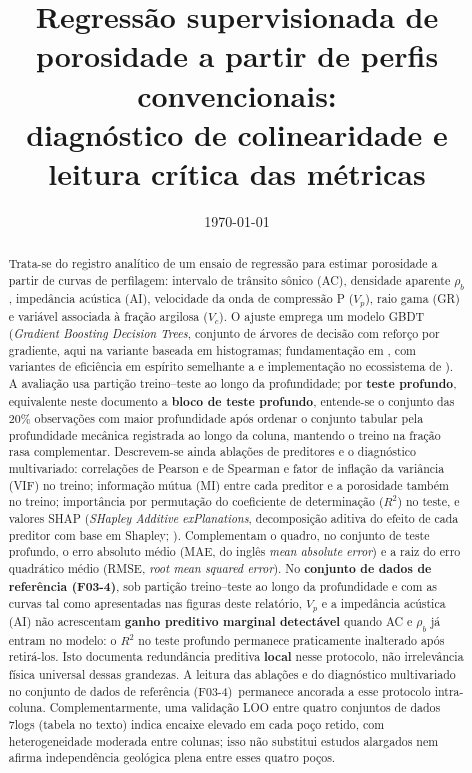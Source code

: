 \documentclass[12pt,a4paper]{article}
\title{Regressão supervisionada de porosidade a partir de perfis convencionais:\\
diagnóstico de colinearidade e leitura crítica das métricas}
\author{}
\date{\today}
\newcommand{\dadosref}{conjunto de dados de referência (F03-4)}
\begin{document}
\maketitle

\begin{abstract}
Trata-se do registro analítico de um ensaio de regressão para estimar porosidade
a partir de curvas de perfilagem: intervalo de trânsito sônico (AC), densidade
aparente \(\rho_b\), impedância acústica (AI), velocidade da onda de compressão
P (\(V_p\)), raio gama (GR) e variável associada à fração argilosa (\(V_c\)).
O ajuste emprega um modelo GBDT (\textit{Gradient Boosting Decision Trees}, conjunto
de árvores de decisão com reforço por gradiente, aqui na variante baseada em
histogramas; fundamentação em \citealp{friedman2001greedy}, com variantes de
eficiência em espírito semelhante a \citealp{ke2017lightgbm} e implementação no
ecossistema de \citealp{pedregosa2011scikit}). A avaliação usa partição treino--teste ao longo da profundidade;
por \textbf{teste profundo}, equivalente neste documento a \textbf{bloco de teste profundo},
entende-se o conjunto das \(20\%\) observações com maior profundidade após ordenar o
conjunto tabular pela profundidade mecânica registrada ao longo da coluna, mantendo o treino na fração rasa
complementar. Descrevem-se ainda ablações de preditores e o diagnóstico multivariado: correlações de Pearson
e de Spearman e fator de inflação da variância (VIF) no treino; informação mútua
(MI) entre cada preditor e a porosidade também no treino; importância por permutação do
coeficiente de determinação (\(R^2\)) no teste, e valores SHAP
(\textit{SHapley Additive exPlanations}, decomposição aditiva do efeito de cada
preditor com base em Shapley; \citealp{lundberg2017unified}). Complementam o quadro, no conjunto de teste profundo,
o erro absoluto médio (MAE, do inglês \textit{mean absolute error}) e a raiz do
erro quadrático médio (RMSE, \textit{root mean squared error}). No \textbf{\dadosref}, sob partição treino--teste ao longo da profundidade e com as curvas
tal como apresentadas nas figuras deste relatório, \(V_p\) e a impedância acústica (AI) não acrescentam
\textbf{ganho preditivo marginal detectável} quando AC e \(\rho_b\) já entram no
modelo: o \(R^2\) no teste profundo permanece praticamente inalterado após retirá-los.
Isto documenta redundância preditiva \textbf{local} nesse protocolo, não
irrelevância física universal dessas grandezas. A leitura das ablações e do diagnóstico
multivariado no \dadosref\ permanece ancorada a esse protocolo intra-coluna.
Complementarmente, uma validação LOO entre quatro conjuntos de dados 7logs (tabela no texto)
indica encaixe elevado em cada poço retido, com heterogeneidade moderada entre colunas;
isso não substitui estudos alargados nem afirma independência geológica plena entre
esses quatro poços.
\end{abstract}
\end{document}
